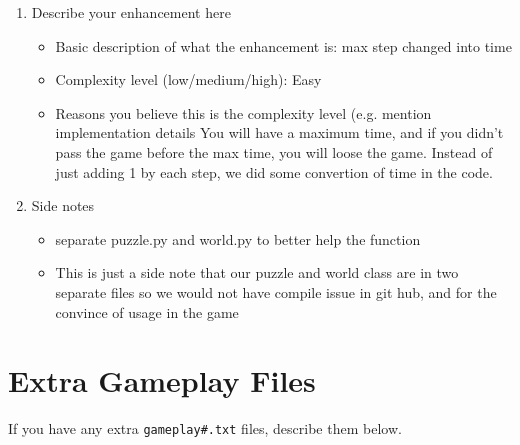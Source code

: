 \documentclass[11pt]{article}
\begin{document}
\begin{enumerate}
\item Describe your enhancement here
	\begin{itemize}
	\item Basic description of what the enhancement is: \newline max step changed into time
	\item Complexity level (low/medium/high): \newline Easy
	\item Reasons you believe this is the complexity level (e.g. mention implementation details 
 \newline You will have a maximum time, and if you didn't pass the game before the max time, you will loose the game. Instead of just adding 1 by each step, we did some convertion of time in the code. 
	\end{itemize}

\item Side notes
	\begin{itemize}
	\item  separate puzzle.py and world.py to better help the function 
	\item  This is just a side note that our puzzle and world class are in two separate files so we would not have compile issue in git hub, and for the convince of usage in the game 
	\end{itemize}






\end{enumerate}


\section*{Extra Gameplay Files}

If you have any extra \texttt{gameplay\#.txt} files, describe them below.
\end{document}
